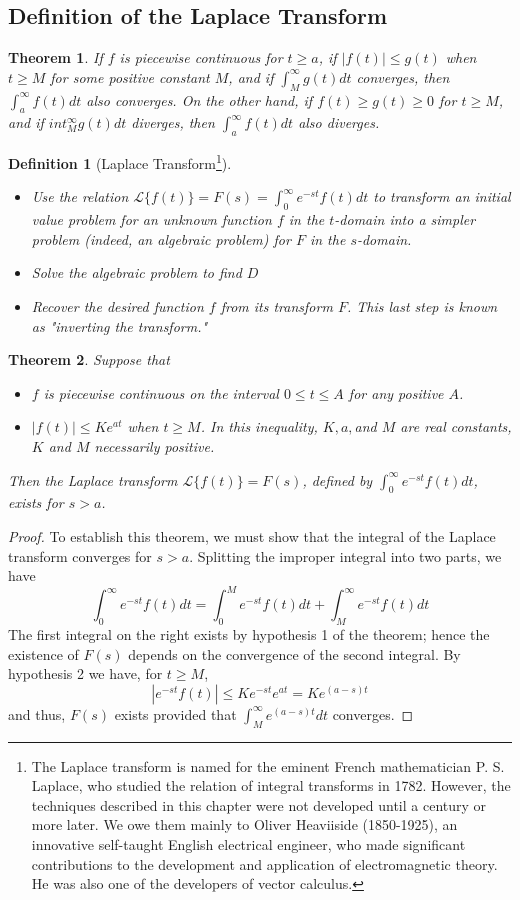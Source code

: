 \documentclass[10pt]{report}
\newtheorem{thm3}{Theorem}[subsection]
\newtheorem{def3}{Definition}[subsection]
\begin{document}
\subsection{Definition of the Laplace Transform}
\begin{thm3}
If $f$ is piecewise continuous for $t\geq a$, if $|f(t)|\leq g(t)$ when $t\geq M$ for some positive constant $M$, and if $\int_M^\infty g(t)dt$ converges, then $\int_a^\infty f(t)dt$ also converges. On the other hand, if $f(t)\geq g(t)\geq 0$ for $t\geq M$, and if $int_M^\infty g(t)dt$ diverges, then $\int_a^\infty f(t)dt$ also diverges.
\end{thm3}
\begin{def3}[Laplace Transform\footnote{The Laplace transform is named for the eminent French mathematician P. S. Laplace, who studied the relation of integral transforms in 1782. However, the techniques described in this chapter were not developed until a century or more later. We owe them mainly to Oliver Heaviiside (1850-1925), an innovative self-taught English electrical engineer, who made significant contributions to the development and application of electromagnetic theory. He was also one of the developers of vector calculus.}]
\begin{itemize}
\item[1.] Use the relation $\mathcal{L}\{f(t)\}=F(s)=\int_0^\infty e^{-st}f(t)dt$ to transform an initial value problem for an unknown function $f$ in the $t$-domain into a simpler problem (indeed, an algebraic problem) for $F$ in the $s$-domain.
\item[2.] Solve the algebraic problem to find $D$
\item[3.] Recover the desired function $f$ from its transform $F$. This last step is known as "inverting the transform."
\end{itemize}
\end{def3}
\begin{thm3}
Suppose that 
\begin{itemize}
\item[1.] $f$ is piecewise continuous on the interval $0\leq t\leq A$ for any positive $A$.
\item[2.] $|f(t)|\leq Ke^{at}$ when $t\geq M$. In this inequality, $K,a,$and $M$ are real constants, $K$ and $M$ necessarily positive.
\end{itemize}
Then the Laplace transform $\mathcal{L}\{f(t)\}=F(s)$, defined by $\int_0^\infty e^{-st}f(t)dt$, exists for $s>a$.
\end{thm3}
\begin{proof}
To establish this theorem, we must show that the integral of the Laplace transform converges for $s>a$. Splitting the improper integral into two parts, we have
$$\int_0^\infty e^{-st}f(t)dt = \int_0^Me^{-st}f(t)dt+\int_M^\infty e^{-st}f(t)dt$$
The first integral on the right exists by hypothesis 1 of the theorem; hence the existence of $F(s)$ depends on the convergence of the second integral. By hypothesis 2 we have, for $t\geq M$,
$$|e^{-st}f(t)|\leq Ke^{-st}e^{at} = Ke^{(a-s)t}$$
and thus, $F(s)$ exists provided that $\int_M^\infty e^{(a-s)t}dt$ converges.
\end{proof}
\end{document}
